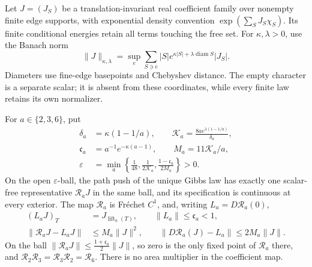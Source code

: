 Let \(J=(J_S)\) be a translation-invariant real coefficient family over
nonempty finite edge supports, with exponential density convention
\(\exp(\sum_SJ_S\chi_S)\). Its finite conditional energies retain all terms
touching the free set. For \(\kappa,\lambda>0\), use the Banach norm
\begin{equation}
 \|J\|_{\kappa,\lambda}
 =\sup_e\sum_{S\ni e}|S|e^{\kappa|S|+\lambda\operatorname{diam}S}|J_S|.
 \label{eq:rg-spatial-character-norm}
\end{equation}
Diameters use fine-edge basepoints and Chebyshev distance. The empty
character is a separate scalar; it is absent from these coordinates, while
every finite law retains its own normalizer.

For \(a\in\{2,3,6\}\), put
\begin{equation}
 \begin{aligned}
 \delta_a&=\kappa(1-1/a),\qquad
 \mathcal K_a=\frac{8ae^{\lambda(1-1/a)}}{\delta_a},\\
 \mathfrak c_a&=a^{-1}e^{-\kappa(a-1)},\qquad M_a=11\mathcal K_a/a,\\
 \varepsilon&=\min_a\left\{\frac1{48},\frac1{2\mathcal K_a},
                              \frac{1-\mathfrak c_a}{2M_a}\right\}>0.
 \end{aligned}
 \label{eq:rg-spatial-local-radius}
\end{equation}
On the open \(\varepsilon\)-ball, the path push of the unique Gibbs law has
exactly one scalar-free representative \(\mathscr R_aJ\) in the same ball,
and its specification is continuous at every exterior. The map
\(\mathscr R_a\) is Fr\'echet \(C^1\), and, writing
\(L_a=D\mathscr R_a(0)\),
\begin{equation}
 \begin{split}
 (L_aJ)_T&=J_{\operatorname{lift}_a(T)},\qquad \|L_a\|\le\mathfrak c_a<1,\\
 \|\mathscr R_aJ-L_aJ\|&\le M_a\|J\|^2,\qquad
 \|D\mathscr R_a(J)-L_a\|\le2M_a\|J\|.
 \end{split}
 \label{eq:rg-spatial-local-estimates}
\end{equation}
On the ball \(\|\mathscr R_aJ\|\le\frac{1+\mathfrak c_a}2\|J\|\), so zero
is the only fixed point of \(\mathscr R_a\) there, and
\(\mathscr R_2\mathscr R_3=\mathscr R_3\mathscr R_2=\mathscr R_6\). There is
no area multiplier in the coefficient map. 

